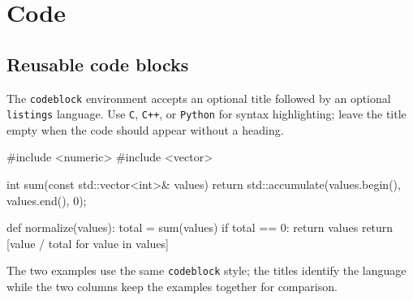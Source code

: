 \chapter{Code}

\section{Reusable code blocks}
The \texttt{codeblock} environment accepts an optional title followed by an optional
\texttt{listings} language. Use \texttt{C}, \texttt{C++}, or \texttt{Python} for
syntax highlighting; leave the title empty when the code should appear without a
heading.

\begin{twocolumns}
\begin{codeblock}[C++ example][C++]
#include <numeric>
#include <vector>

int sum(const std::vector<int>& values) {
    return std::accumulate(values.begin(), values.end(), 0);
}
\end{codeblock}
\twocolumnbreak
\begin{codeblock}
def normalize(values):
    total = sum(values)
    if total == 0:
        return values
    return [value / total for value in values]
\end{codeblock}
\end{twocolumns}

The two examples use the same \texttt{codeblock} style; the titles identify the
language while the two columns keep the examples together for comparison.
